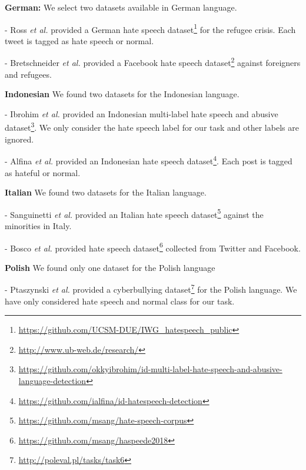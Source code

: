 \documentclass[runningheads]{llncs}
\begin{document}
\noindent\textbf{German:} We select two datasets available in German language.

\begin{compactenum}
    \item [-] Ross \textit{et al.} \cite{ross2017measuring} provided a German hate speech dataset\footnote{\url{https://github.com/UCSM-DUE/IWG_hatespeech_public}} for the refugee crisis. Each tweet is tagged as hate speech or normal.
    \item [-] Bretschneider \textit{et al.} \cite{bretschneider2017detecting} provided a Facebook hate speech dataset\footnote{\url{http://www.ub-web.de/research/}} against foreigners and refugees.
\end{compactenum}




\noindent\textbf{Indonesian} We found two datasets for the Indonesian language.

\begin{compactenum}
    \item [-] Ibrohim \textit{et al.} \cite{ibrohim2019multi} provided an Indonesian multi-label hate speech and abusive dataset\footnote{\url{https://github.com/okkyibrohim/id-multi-label-hate-speech-and-abusive-language-detection}}. We only consider the hate speech label for our task and other labels are ignored.
    \item [-] Alfina \textit{et al.} \cite{alfina2017hate} provided an Indonesian hate speech dataset\footnote{\url{https://github.com/ialfina/id-hatespeech-detection}}. Each post is tagged as hateful or normal.
\end{compactenum}



\noindent\textbf{Italian} We found two datasets for the Italian language.
\begin{compactenum}
    \item [-] Sanguinetti \textit{et al.} \cite{sanguinetti2018italian} provided an Italian hate speech dataset\footnote{\url{https://github.com/msang/hate-speech-corpus}} against the minorities in Italy.
    \item [-] Bosco \textit{et al.} \cite{bosco2018overview} provided hate speech dataset\footnote{\url{https://github.com/msang/haspeede2018}} collected from Twitter and Facebook.
\end{compactenum}


\noindent\textbf{Polish} We found only one dataset for the Polish language
\begin{compactenum}
    \item [-] Ptaszynski \textit{et al.} \cite{ptaszynski2019results} provided a cyberbullying dataset\footnote{\url{http://poleval.pl/tasks/task6}} for the Polish language. We have only considered hate speech and normal class for our task.
\end{compactenum}
\end{document}
